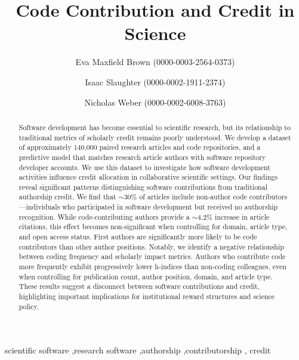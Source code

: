 \documentclass[
  number,
  3p,
  onecolumn]{elsarticle}
\begin{document}
\begin{frontmatter}
\title{Code Contribution and Credit in Science}
\author[1]{Eva Maxfield Brown (0000-0003-2564-0373)%
%
}
\author[1]{Isaac Slaughter (0000-0002-1911-2374)%
%
}

\author[1]{Nicholas Weber (0000-0002-6008-3763)%
%
}






        
\begin{abstract}
Software development has become essential to scientific research, but
its relationship to traditional metrics of scholarly credit remains
poorly understood. We develop a dataset of approximately 140,000 paired
research articles and code repositories, and a predictive model that
matches research article authors with software repository developer
accounts. We use this dataset to investigate how software development
activities influence credit allocation in collaborative scientific
settings. Our findings reveal significant patterns distinguishing
software contributions from traditional authorship credit. We find that
$\sim$30\% of articles include non-author code
contributors---individuals who participated in software development but
received no authorship recognition. While code-contributing authors
provide a $\sim$4.2\% increase in article citations, this
effect becomes non-significant when controlling for domain, article
type, and open access status. First authors are significantly more
likely to be code contributors than other author positions. Notably, we
identify a negative relationship between coding frequency and scholarly
impact metrics. Authors who contribute code more frequently exhibit
progressively lower h-indices than non-coding colleagues, even when
controlling for publication count, author position, domain, and article
type. These results suggest a disconnect between software contributions
and credit, highlighting important implications for institutional reward
structures and science policy.
\end{abstract}





\begin{keyword}
    scientific software \sep research
software \sep authorship \sep contributorship \sep 
    credit
\end{keyword}
\end{frontmatter}
    
\end{document}
